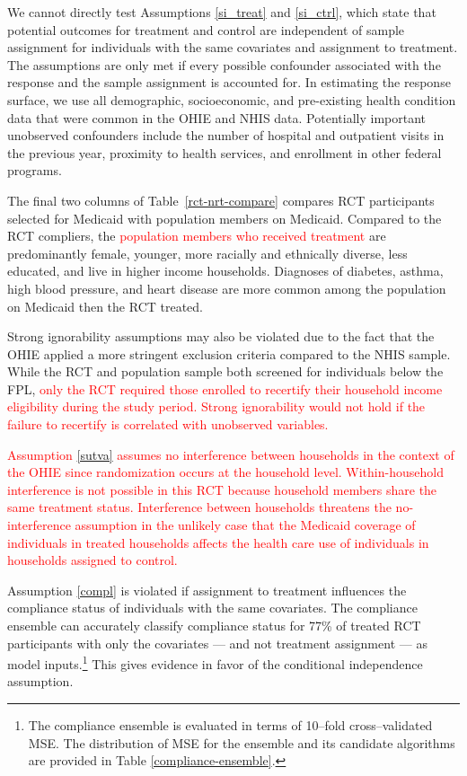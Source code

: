 \documentclass[hidelinks,12pt]{article}
\begin{document}
We cannot directly test Assumptions \eqref{si_treat} and \eqref{si_ctrl}, which state that potential outcomes for treatment and control are independent of sample assignment for individuals with the same covariates and assignment to treatment. The assumptions are only met if every possible confounder associated with the response and the sample assignment is accounted for. In estimating the response surface, we use all demographic, socioeconomic, and pre-existing health condition data that were common in the OHIE and NHIS data. Potentially important unobserved confounders include the number of hospital and outpatient visits in the previous year, proximity to health services, and enrollment in other federal programs. 

The final two columns of Table~\ref{rct-nrt-compare} compares RCT participants selected for Medicaid with population members on Medicaid. Compared to the RCT compliers, the \textcolor{red}{population members who received treatment} are predominantly female, younger, more racially and ethnically diverse, less educated, and live in higher income households. Diagnoses of diabetes, asthma, high blood pressure, and heart disease are more common among the population on Medicaid then the RCT treated.

Strong ignorability assumptions may also be violated due to the fact that the OHIE applied a more stringent exclusion criteria compared to the NHIS sample. While the RCT and population sample both screened for individuals below the FPL,  \textcolor{red}{only the RCT required those enrolled to recertify their household income eligibility during the study period. Strong ignorability would not hold if the failure to recertify is correlated with unobserved variables.} 

\textcolor{red}{Assumption \ref{sutva} assumes no interference between households in the context of the OHIE since randomization occurs at the household level. Within-household interference is not possible in this RCT because household members share the same treatment status. Interference between households threatens the no-interference assumption in the unlikely case that the Medicaid coverage of individuals in treated households affects the health care use of individuals in households assigned to control.} 

Assumption \eqref{compl} is violated if assignment to treatment influences the compliance status of individuals with the same covariates. The compliance ensemble can accurately classify compliance status for 77\% of treated RCT participants with only the covariates --- and not treatment assignment --- as model inputs.\footnote{The compliance ensemble is evaluated in terms of 10--fold cross--validated MSE. The distribution of MSE for the ensemble and its candidate algorithms are provided in Table \ref{compliance-ensemble}.}  This gives evidence in favor of the conditional independence assumption.
\end{document}
